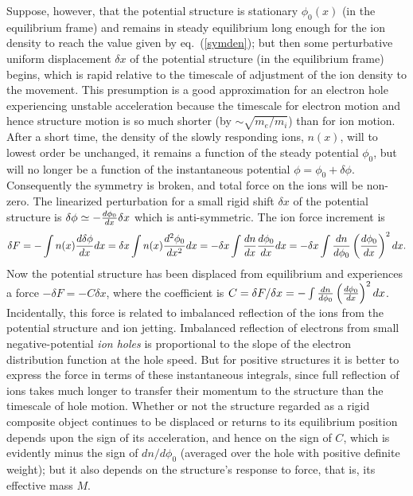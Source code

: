 \documentclass[12pt]{article}
\begin{document}
Suppose, however, that the potential structure is stationary
$\phi_0(x)$ (in the equilibrium frame) and remains in steady
equilibrium long enough for the ion density to reach the value given
by eq.\ (\ref{symden}); but then some perturbative uniform
displacement $\delta x$ of the potential structure (in the equilibrium
frame) begins, which is rapid relative to the timescale of adjustment
of the ion density to the movement. This presumption is a good
approximation for an electron hole experiencing unstable acceleration
because the timescale for electron motion and hence structure motion
is so much shorter (by $\sim \sqrt{m_e/m_i}$) than for ion
motion. After a short time, the density of the slowly responding ions,
$n(x)$, will to lowest order be unchanged, it remains a function of
the steady potential $\phi_0$, but will no longer be a function of the
instantaneous potential $\phi=\phi_0+\delta\phi$. Consequently the
symmetry is broken, and total force on the ions will be non-zero.
The linearized perturbation for a small rigid shift $\delta x$ of the potential
structure is
$\delta\phi\simeq-{d\phi_0\over dx}\delta x$ which is
anti-symmetric. The ion force increment is
\begin{equation}
  \delta F = -\int n(x) {d\delta\phi\over dx} dx 
  =\delta x \int n(x) {d^2\phi_0\over dx^2} dx 
  =-\delta x \int {dn\over dx} {d\phi_0\over dx} dx
  =-\delta x \int{dn\over d\phi_0}\left(d\phi_0 \over dx\right)^2 dx.
\end{equation}
Now the potential structure has been displaced from equilibrium and
experiences a force $-\delta F= -C \delta x$, where the coefficient is
$C=\delta F/\delta x=-\int{dn\over d\phi_0}\left(d\phi_0 \over
  dx\right)^2 dx$. Incidentally, this force is related to imbalanced
reflection of the ions from the potential structure and ion
jetting. Imbalanced reflection of electrons from small
negative-potential \emph{ion holes} is proportional to the slope of the
electron distribution function at the hole speed\cite{Dupree1983}. But
for positive structures it is better to express the force in terms of
these instantaneous integrals, since full reflection of ions takes
much longer to transfer their momentum to the structure than the
timescale of hole motion. Whether or not the structure regarded as a
rigid composite object continues to be displaced or returns to its
equilibrium position depends upon the sign of its acceleration, and
hence on the sign of $C$, which is evidently minus the sign of
$dn/d\phi_0$ (averaged over the hole with positive definite weight);
but it also depends on the structure's response to force, that is, its
effective mass $M$.
\end{document}
